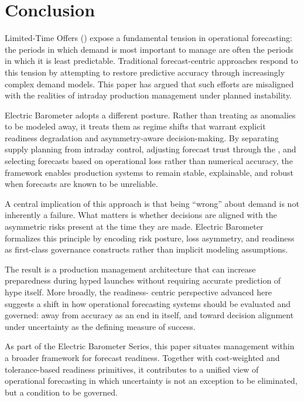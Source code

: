 
\section{Conclusion}
\label{sec:conclusion}

Limited-Time Offers (\LTOs{}) expose a fundamental tension in operational forecasting: the periods in
which demand is most important to manage are often the periods in which it is least predictable.
Traditional forecast-centric approaches respond to this tension by attempting to restore predictive
accuracy through increasingly complex demand models. This paper has argued that such efforts are
misaligned with the realities of intraday production management under planned instability.

Electric Barometer adopts a different posture. Rather than treating \LTOs{} as anomalies to be
modeled away, it treats them as regime shifts that warrant explicit readiness degradation and
asymmetry-aware decision-making. By separating supply planning from intraday control, adjusting
forecast trust through the \RAL{}, and selecting forecasts based on operational loss rather than
numerical accuracy, the framework enables production systems to remain stable, explainable, and
robust when forecasts are known to be unreliable.

A central implication of this approach is that being ``wrong'' about demand is not inherently a
failure. What matters is whether decisions are aligned with the asymmetric risks present at the time
they are made. Electric Barometer formalizes this principle by encoding risk posture, loss asymmetry,
and readiness as first-class governance constructs rather than implicit modeling assumptions.

The result is a production management architecture that can increase preparedness during hyped
\LTO{} launches without requiring accurate prediction of hype itself. More broadly, the readiness-
centric perspective advanced here suggests a shift in how operational forecasting systems should be
evaluated and governed: away from accuracy as an end in itself, and toward decision alignment under
uncertainty as the defining measure of success.

As part of the Electric Barometer Series, this paper situates \LTO{} management within a broader
framework for forecast readiness. Together with cost-weighted and tolerance-based readiness
primitives, it contributes to a unified view of operational forecasting in which uncertainty is not an
exception to be eliminated, but a condition to be governed.
